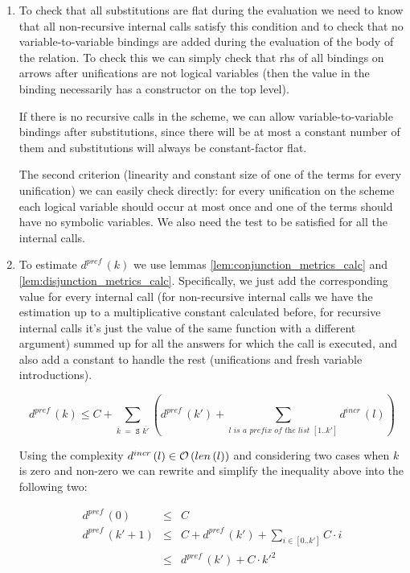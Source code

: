 \begin{enumerate}
\item To check that all substitutions are flat during the evaluation we need to know that all non-recursive internal calls satisfy this condition and to check that no variable-to-variable bindings are added during the evaluation of the body of the relation. To check this we can simply check that rhs of all bindings on arrows after unifications are not logical variables (then the value in the binding
necessarily has a constructor on the top level).

If there is no recursive calls in the scheme, we can allow variable-to-variable bindings after substitutions, since there will be at most a constant number of them and substitutions will always be constant-factor flat.

The second criterion (linearity and constant size of one of the terms for every unification) we can easily check directly: for every unification on the scheme each logical variable should occur at most once and one of the terms should have no symbolic variables. We also need the test to be satisfied for all the internal calls.

\item To estimate $d^{pref}\,(k)$ we use lemmas \ref{lem:conjunction_metrics_calc} and \ref{lem:disjunction_metrics_calc}. Specifically, we just add the corresponding value for every internal call
  (for non-recursive internal calls we have the estimation up to a multiplicative constant calculated before, for recursive internal calls it's just the value of the same function with a
  different argument) summed up for all the answers for which the call is executed, and also add a constant to handle the rest (unifications and fresh variable introductions).

\[ d^{pref}\,(k) \le C + \sum_{\overline{k} \;=\; \texttt{S $\overline{k'}$}} (d^{pref}\,(k') + \sum_{\textit{$l$ is a prefix of the list $[1..k']$}} d^{incr}\,(l)) \]

Using the complexity $d^{incr}\,(l) \in \mathcal{O}\,(len\,(l))$ and considering two cases when $k$ is zero and non-zero we can rewrite and simplify the inequality above into the following two:

\[
\begin{array}{lcl}
d^{pref}\,(0) &\le& C \\
d^{pref}\,(k' + 1) &\le& C + d^{pref}\,(k') + \sum_{i \in [0..k']} C \cdot i \\
            &\le& d^{pref}\,(k') + C \cdot k'^2 
\end{array} \]


\end{enumerate}
